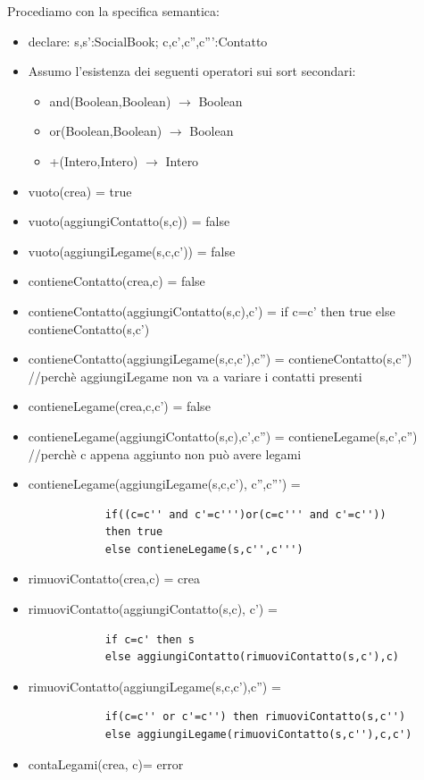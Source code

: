 \documentclass{article}
\begin{document}
	Procediamo con la specifica semantica:
	\begin{itemize}
		\item declare: s,s':SocialBook; c,c',c'',c''':Contatto
		\item Assumo l'esistenza dei seguenti operatori sui sort secondari:
		\begin{itemize}
			\item and(Boolean,Boolean) $\rightarrow$ Boolean
			\item or(Boolean,Boolean) $\rightarrow$ Boolean
			\item +(Intero,Intero) $\rightarrow$ Intero
		\end{itemize}
		\item vuoto(crea) = true
		\item vuoto(aggiungiContatto(s,c)) = false
		\item vuoto(aggiungiLegame(s,c,c')) = false
		\item contieneContatto(crea,c) = false
		\item contieneContatto(aggiungiContatto(s,c),c') = if c=c' then true else contieneContatto(s,c')
		\item contieneContatto(aggiungiLegame(s,c,c'),c'') = contieneContatto(s,c'')  //perchè aggiungiLegame non va a variare i contatti presenti
		\item contieneLegame(crea,c,c') = false
		\item contieneLegame(aggiungiContatto(s,c),c',c'') = contieneLegame(s,c',c'') //perchè c appena aggiunto non può avere legami
		\item contieneLegame(aggiungiLegame(s,c,c'), c'',c''') = 
		\begin{verbatim}
			if((c=c'' and c'=c''')or(c=c''' and c'=c'')) 
			then true
			else contieneLegame(s,c'',c''')
		\end{verbatim}
		\item rimuoviContatto(crea,c) = crea
		\item rimuoviContatto(aggiungiContatto(s,c), c') = 
		\begin{verbatim}
			if c=c' then s 
			else aggiungiContatto(rimuoviContatto(s,c'),c)
		\end{verbatim}
		\item rimuoviContatto(aggiungiLegame(s,c,c'),c'') =
		\begin{verbatim}
			if(c=c'' or c'=c'') then rimuoviContatto(s,c'')
			else aggiungiLegame(rimuoviContatto(s,c''),c,c')
		\end{verbatim}
		\item contaLegami(crea, c)= error

\end{itemize}
\end{document}
